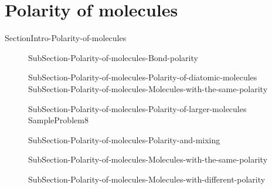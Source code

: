 \documentclass[main.tex]{subfiles}
\newcommand\chapterlabel{Ch-naming}\setcounter{figurenewcounter}{0}\setcounter{tablenewcounter}{0}\setcounter{formulanewcounter}{0}\chapterpicture{../{\chapterlabel}/figure1}\chapterpicturelabel{Pixnio}
\begin{document}
{\section{Polarity of molecules}{SectionIntro-Polarity-of-molecules}
\sloppy \begin{description}
\item[] {SubSection-Polarity-of-molecules-Bond-polarity}
\item[] {SubSection-Polarity-of-molecules-Polarity-of-diatomic-molecules}
{SubSection-Polarity-of-molecules-Molecules-with-the-same-polarity}
\item[] {SubSection-Polarity-of-molecules-Polarity-of-larger-molecules}
{SampleProblem8}

\item[] {SubSection-Polarity-of-molecules-Polarity-and-mixing}
\item[] {SubSection-Polarity-of-molecules-Molecules-with-the-same-polarity}
\item[] {SubSection-Polarity-of-molecules-Molecules-with-different-polarity}
\end{description}
\renewcommand\chapterlabel{Ch-naming}

}{}
 
 








 
\end{document}
